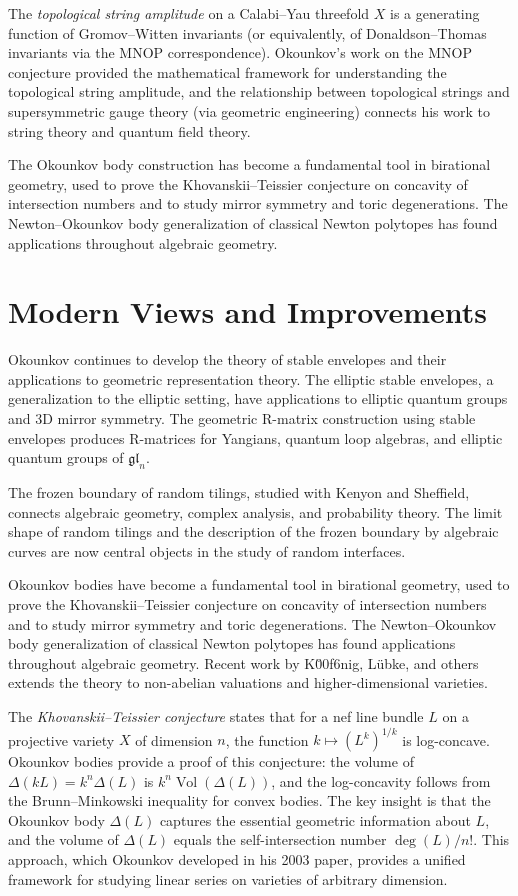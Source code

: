 The \emph{topological string amplitude} on a Calabi--Yau threefold $X$ is a generating function of Gromov--Witten invariants (or equivalently, of Donaldson--Thomas invariants via the MNOP correspondence). Okounkov's work on the MNOP conjecture provided the mathematical framework for understanding the topological string amplitude, and the relationship between topological strings and supersymmetric gauge theory (via geometric engineering) connects his work to string theory and quantum field theory.

The Okounkov body construction has become a fundamental tool in birational geometry, used to prove the Khovanskii--Teissier conjecture on concavity of intersection numbers and to study mirror symmetry and toric degenerations. The Newton--Okounkov body generalization of classical Newton polytopes has found applications throughout algebraic geometry.

\section{Modern Views and Improvements}

Okounkov continues to develop the theory of stable envelopes and their applications to geometric representation theory. The elliptic stable envelopes, a generalization to the elliptic setting, have applications to elliptic quantum groups and 3D mirror symmetry. The geometric R-matrix construction using stable envelopes produces R-matrices for Yangians, quantum loop algebras, and elliptic quantum groups of $\mathfrak{gl}_n$.

The frozen boundary of random tilings, studied with Kenyon and Sheffield, connects algebraic geometry, complex analysis, and probability theory. The limit shape of random tilings and the description of the frozen boundary by algebraic curves are now central objects in the study of random interfaces.

Okounkov bodies have become a fundamental tool in birational geometry, used to prove the Khovanskii--Teissier conjecture on concavity of intersection numbers and to study mirror symmetry and toric degenerations. The Newton--Okounkov body generalization of classical Newton polytopes has found applications throughout algebraic geometry. Recent work by K\u00f6nig, L\"ubke, and others extends the theory to non-abelian valuations and higher-dimensional varieties.

The \emph{Khovanskii--Teissier conjecture} states that for a nef line bundle $L$ on a projective variety $X$ of dimension $n$, the function $k \mapsto (L^k)^{1/k}$ is log-concave. Okounkov bodies provide a proof of this conjecture: the volume of $\Delta(kL) = k^n \Delta(L)$ is $k^n \operatorname{Vol}(\Delta(L))$, and the log-concavity follows from the Brunn--Minkowski inequality for convex bodies. The key insight is that the Okounkov body $\Delta(L)$ captures the essential geometric information about $L$, and the volume of $\Delta(L)$ equals the self-intersection number $\deg(L)/n!$. This approach, which Okounkov developed in his 2003 paper, provides a unified framework for studying linear series on varieties of arbitrary dimension.

